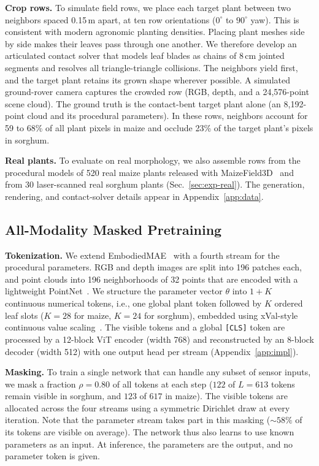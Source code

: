 \documentclass[10pt,twocolumn,letterpaper]{article}
\begin{document}
\noindent\textbf{Crop rows.}
To simulate field rows, we place each target plant between two neighbors spaced 0.15\,m apart, at ten row orientations ($0^\circ$ to $90^\circ$ yaw). This is consistent with modern agronomic planting densities. Placing plant meshes side by side makes their leaves pass through one another. We therefore develop an articulated contact solver that models leaf blades as chains of 8\,cm jointed segments and resolves all triangle-triangle collisions. The neighbors yield first, and the target plant retains its grown shape wherever possible. A simulated ground-rover camera captures the crowded row (RGB, depth, and a 24{,}576-point scene cloud). The ground truth is the contact-bent target plant alone (an 8{,}192-point cloud and its procedural parameters). In these rows, neighbors account for 59 to 68\% of all plant pixels in maize and occlude 23\% of the target plant's pixels in sorghum.

\noindent\textbf{Real plants.}
To evaluate on real morphology, we also assemble rows from the procedural models of 520 real maize plants released with MaizeField3D~\citep{maizefield3d2025} and from 30 laser-scanned real sorghum plants (Sec.~\ref{sec:exp-real}). The generation, rendering, and contact-solver details appear in Appendix~\ref{app:data}.

\subsection{All-Modality Masked Pretraining}
\label{sec:method-pretrain}

\noindent\textbf{Tokenization.}
We extend EmbodiedMAE~\citep{dong2025embodiedmae} with a fourth stream for the procedural parameters. RGB and depth images are split into 196 patches each, and point clouds into 196 neighborhoods of 32 points that are encoded with a lightweight PointNet~\citep{pang2022pointmae,qi2017pointnet}. We structure the parameter vector $\theta$ into $1 + K$ continuous numerical tokens, i.e., one global plant token followed by $K$ ordered leaf slots ($K = 28$ for maize, $K = 24$ for sorghum), embedded using xVal-style continuous value scaling~\citep{golkar2023xval}. The visible tokens and a global \texttt{[CLS]} token are processed by a 12-block ViT encoder (width 768) and reconstructed by an 8-block decoder (width 512) with one output head per stream (Appendix~\ref{app:impl}).

\noindent\textbf{Masking.}
To train a single network that can handle any subset of sensor inputs, we mask a fraction $\rho = 0.80$ of all tokens at each step ($122$ of $L = 613$ tokens remain visible in sorghum, and $123$ of $617$ in maize). The visible tokens are allocated across the four streams using a symmetric Dirichlet draw at every iteration. Note that the parameter stream takes part in this masking ($\sim 58\%$ of its tokens are visible on average). The network thus also learns to use known parameters as an input. At inference, the parameters are the output, and no parameter token is given. %
\end{document}
